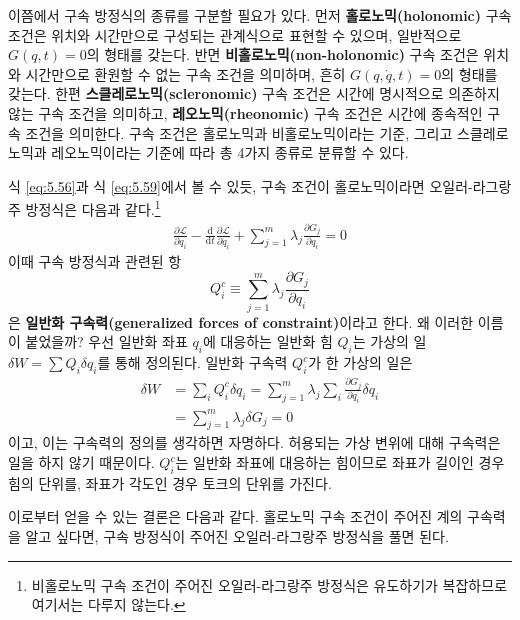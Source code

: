\documentclass[chapter, oneside, b5paper]{oblivoir}
\theoremstyle{plain}
\theoremstyle{definition}
\theoremstyle{remark}
\begin{document}
이쯤에서 구속 방정식의 종류를 구분할 필요가 있다. 먼저 \textbf{홀로노믹(holonomic)} 구속 조건은 위치와 시간만으로 구성되는 관계식으로 표현할 수 있으며, 일반적으로 $G(q, t) = 0$의 형태를 갖는다. 반면 \textbf{비홀로노믹(non-holonomic)} 구속 조건은 위치와 시간만으로 환원할 수 없는 구속 조건을 의미하며, 흔히 $G(q, \dot{q}, t)=0$의 형태를 갖는다. 한편 \textbf{스클레로노믹(scleronomic)} 구속 조건은 시간에 명시적으로 의존하지 않는 구속 조건을 의미하고, \textbf{레오노믹(rheonomic)} 구속 조건은 시간에 종속적인 구속 조건을 의미한다. 구속 조건은 홀로노믹과 비홀로노믹이라는 기준, 그리고 스클레로노믹과 레오노믹이라는 기준에 따라 총 4가지 종류로 분류할 수 있다.

식 \ref{eq:5.56}과 식 \ref{eq:5.59}에서 볼 수 있듯, 구속 조건이 홀로노믹이라면 오일러-라그랑주 방정식은 다음과 같다.\footnote{비홀로노믹 구속 조건이 주어진 오일러-라그랑주 방정식은 유도하기가 복잡하므로 여기서는 다루지 않는다.}
\begin{equation}
\begin{aligned}
    \frac{\partial \mathcal{L}}{\partial q_i} - \frac{\mathrm{d}}{\mathrm{d}t}\frac{\partial \mathcal{L}}{\partial \dot{q_i}} + \sum_{j=1}^{m}\lambda_j\frac{\partial {G}_{j}}{\partial q_i} = 0
\end{aligned}
\label{eq:6.21}
\end{equation}
이때 구속 방정식과 관련된 항
\begin{equation}
    Q_i^{c}\equiv \sum_{j=1}^{m}\lambda_j\frac{\partial G_j}{\partial q_i}
\end{equation}
은 \textbf{일반화 구속력(generalized forces of constraint)}이라고 한다. 왜 이러한 이름이 붙었을까? 우선 일반화 좌표 $q_i$에 대응하는 일반화 힘 $Q_i$는 가상의 일 $\delta W = \sum Q_i \delta q_i$를 통해 정의된다. 일반화 구속력 $Q_i^{c}$가 한 가상의 일은
\begin{equation}
\begin{aligned}
\delta W &=\sum_i Q_i^{c}\delta q_i=\sum_{j=1}^{m}\lambda_j \sum_i\frac{\partial G_j}{\partial q_i} \delta q_i\\ &=\sum_{j=1}^{m}\lambda_j \delta G_j =0
\end{aligned}
\end{equation}
이고, 이는 구속력의 정의를 생각하면 자명하다. 허용되는 가상 변위에 대해 구속력은 일을 하지 않기 때문이다. $Q_i^{c}$는 일반화 좌표에 대응하는 힘이므로 좌표가 길이인 경우 힘의 단위를, 좌표가 각도인 경우 토크의 단위를 가진다.

이로부터 얻을 수 있는 결론은 다음과 같다. 홀로노믹 구속 조건이 주어진 계의 구속력을 알고 싶다면, 구속 방정식이 주어진 오일러-라그랑주 방정식을 풀면 된다.
\end{document}
